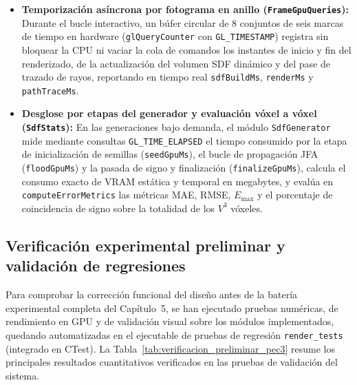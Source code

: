 \begin{itemize}
  \item \textbf{Temporización asíncrona por fotograma en anillo (\texttt{FrameGpuQueries}):} Durante el bucle interactivo, un búfer circular de 8 conjuntos de seis marcas de tiempo en hardware (\texttt{glQueryCounter} con \texttt{GL\_TIMESTAMP}) registra sin bloquear la CPU ni vaciar la cola de comandos los instantes de inicio y fin del renderizado, de la actualización del volumen SDF dinámico y del pase de trazado de rayos, reportando en tiempo real \texttt{sdfBuildMs}, \texttt{renderMs} y \texttt{pathTraceMs}.
  \item \textbf{Desglose por etapas del generador y evaluación vóxel a vóxel (\texttt{SdfStats}):} En las generaciones bajo demanda, el módulo \texttt{SdfGenerator} mide mediante consultas \texttt{GL\_TIME\_\allowbreak ELAPSED} el tiempo consumido por la etapa de inicialización de semillas (\texttt{seedGpuMs}), el bucle de propagación JFA (\texttt{floodGpuMs}) y la pasada de signo y finalización (\texttt{finalize\allowbreak GpuMs}), calcula el consumo exacto de VRAM estática y temporal en megabytes, y evalúa en \texttt{computeErrorMetrics} las métricas MAE, RMSE, $E_{\max}$ y el porcentaje de coincidencia de signo sobre la totalidad de los $V^3$ vóxeles.
\end{itemize}

\subsection{Verificación experimental preliminar y validación de regresiones}

Para comprobar la corrección funcional del diseño antes de la batería experimental completa del Capítulo~5, se han ejecutado pruebas numéricas, de rendimiento en GPU y de validación visual sobre los módulos implementados, quedando automatizadas en el ejecutable de pruebas de regresión \texttt{render\_tests} (integrado en CTest). La Tabla~\ref{tab:verificacion_preliminar_pec3} resume los principales resultados cuantitativos verificados en las pruebas de validación del sistema.

